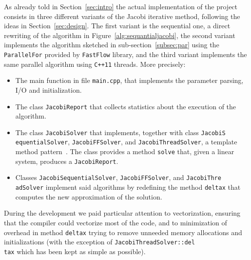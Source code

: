 As already told in Section~\ref{sec:intro} the actual implementation of the project consists in three different variants of the Jacobi iterative method, following the ideas in Section~\ref{sec:design}.
The first variant is the sequential one, a direct rewriting of the algorithm in Figure~\ref{alg:sequantialjacobi}, the second variant implements the algorithm sketched in sub-section~\ref{subsec:par} using the \verb|ParallelFor| provided by \verb|FastFlow| library, and the third variant implements the same parallel algorithm using \verb|C++11| threads.
More precisely:
\begin{itemize}
	\item The main function in file \verb|main.cpp|, that implements the parameter parsing, I/O and initialization.
	\item The class \verb|JacobiReport| that collects statistics about the execution of the algorithm.
	\item The class \verb|JacobiSolver| that implements, together with class \verb|JacobiS|\\ \verb|equentialSolver|, \verb|JacobiFFSolver|, and \verb|JacobiThreadSolver|, a template method pattern~\cite{}.
	The class provides a method \verb|solve| that, given a linear system, produces a \verb|JacobiReport|.
	\item Classes \verb|JacobiSequentialSolver|, \verb|JacobiFFSolver|, and \verb|JacobiThre|\\ \verb|adSolver| implement said algorithms by redefining the method \verb|deltax| that computes the new approximation of the solution.
\end{itemize}

During the development we paid particular attention to vectorization, ensuring that the compiler could vectorize most of the code, and to minimization of overhead in method \verb|deltax| trying to remove unneeded memory allocations and initializations (with the exception of \verb|JacobiThreadSolver::del|\\ \verb|tax| which has been kept as simple as possible).
